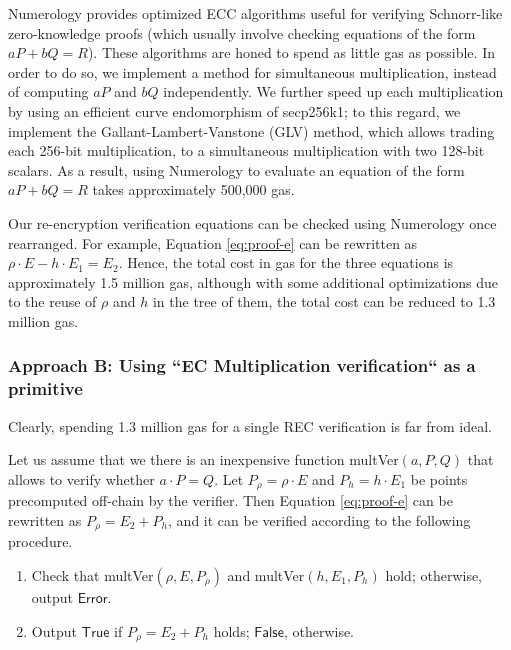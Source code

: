 Numerology provides optimized ECC algorithms useful for verifying Schnorr-like zero-knowledge proofs (which  usually involve checking equations of the form $aP + bQ = R$). These algorithms are honed to spend as little gas as possible. In order to do so, we implement a method for simultaneous multiplication, instead of computing $aP$ and $bQ$ independently. We further speed up each multiplication by using an efficient curve endomorphism of \textsf{secp256k1}; to this regard, we implement the Gallant-Lambert-Vanstone (GLV) method, which allows trading each 256-bit multiplication, to a simultaneous multiplication with two 128-bit scalars. As a result, using Numerology to evaluate an equation of the form $aP + bQ = R$ takes approximately 500,000 gas. 

Our re-encryption verification equations can be checked using Numerology once rearranged. For example, Equation \ref{eq:proof-e} can be rewritten as $\rho \cdot E - h \cdot E_1 = E_2$. Hence, the total cost in gas for the three equations is approximately 1.5 million gas, although with some additional optimizations due to the reuse of $\rho$ and $h$ in the tree of them, the total cost can be reduced to 1.3 million gas. 

\subsubsection{Approach B: Using ``EC Multiplication verification`` as a primitive}
Clearly, spending 1.3 million gas for a single REC verification is far from ideal. 

Let us assume that we there is an inexpensive function \textsf{multVer}$(a, P, Q)$ that allows to verify whether $a \cdot P = Q$. 
Let $P_{\rho} = \rho \cdot E$ and $P_{h} = h \cdot E_1$ be points precomputed off-chain by the verifier. Then Equation \ref{eq:proof-e} can be rewritten as $P_{\rho} = E_2 + P_{h}$, and it can be verified according to the following procedure.
\begin{enumerate}
	\item Check that \textsf{multVer}$(\rho, E, P_{\rho})$ and \textsf{multVer}$(h, E_1, P_h)$ hold; otherwise, output $\mathsf{Error}$.
	\item Output $\mathsf{True}$ if $P_{\rho} = E_2 + P_{h} $ holds; $\mathsf{False}$, otherwise.
\end{enumerate}




